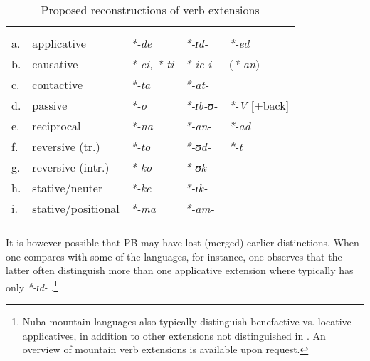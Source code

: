 \documentclass[output=paper]{langsci/langscibook}
\begin{document}
\begin{table}[p]
\begin{tabularx}{\textwidth}{llQQQ}
\lsptoprule
 & &  \citep{Voeltz1977} &  \citep{Schadeberg2003} &  \citep{Doneux1975}\\
\midrule
a. & applicative & \textit{*-de} & \textit{*-ɪd-} & \textit{*-ed}\\
b. & causative & \textit{*-ci,} \textit{*-ti} & \textit{*-ic-i-} & (\textit{*-an})\\
c. & contactive & \textit{*-ta} & \textit{*-at-} & \\
d. & passive & \textit{*-o} & \textit{*-ɪb-ʊ-} & \textit{*-V} [+back]\\
e. & reciprocal & \textit{*-na} & \textit{*-an-} & \textit{*-ad}\\
f. & reversive (tr.) & \textit{*-to} & \textit{*-ʊd-} & \textit{*-t}\\
g. & reversive (intr.) & \textit{*-ko} & \textit{*-ʊk-} & \\
h. & stative/neuter & \textit{*-ke} & \textit{*-ɪk-} & \\
i. & stative/positional & \textit{*-ma} & \textit{*-am-} & \\
\lspbottomrule
\end{tabularx}
\caption{Proposed reconstructions of verb extensions }
\label{extab:proto:5}
\end{table}

It is however possible that PB may have lost (merged) earlier distinctions. When one compares  with some of the  languages, for instance, one observes that the latter often distinguish more than one applicative extension where  typically has only \textit{*-ɪd-} \citep[157]{Hyman2007}.\footnote{Nuba mountain languages also typically distinguish benefactive vs. locative applicatives, in addition to other extensions not distinguished in . An overview of  mountain verb extensions \citep{Hyman2014} is available upon request.}
\end{document}
